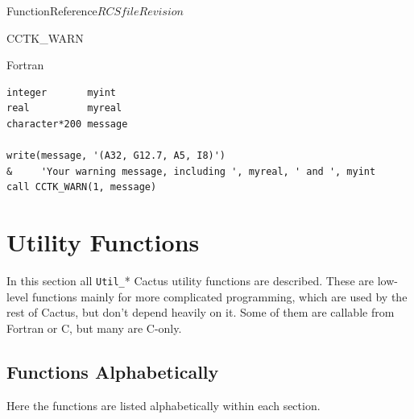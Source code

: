 \begin{cactuspart}{FunctionReference}{$RCSfile$}{$Revision$}
\begin{FunctionDescription}{CCTK\_WARN}
\begin{ExampleSection}
\begin{Example}{Fortran}
\begin{verbatim}
integer       myint
real          myreal
character*200 message

write(message, '(A32, G12.7, A5, I8)')
&     'Your warning message, including ', myreal, ' and ', myint
call CCTK_WARN(1, message)
\end{verbatim}
\end{Example}
\end{ExampleSection}
\end{FunctionDescription}



\chapter{Utility Functions}
\label{sect-FunctionReference/UtilityFunctions}

In this section all \hbox{{\tt Util\_}*} Cactus utility functions are
described.  These are low-level functions mainly for more complicated
programming, which are used by the rest of Cactus, but don't depend
heavily on it.  Some of them are callable from Fortran or C, but
many are C-only.


\section{Functions Alphabetically}

Here the functions are listed alphabetically within each section.







\end{cactuspart}
